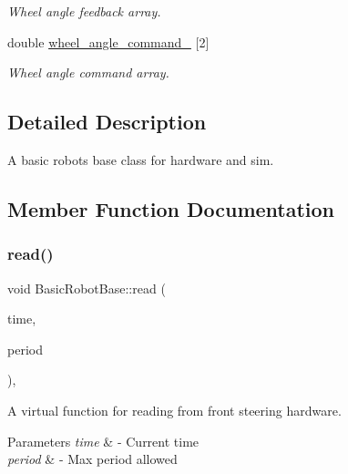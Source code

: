 \begin{DoxyCompactItemize}
\begin{DoxyCompactList}\small\item\em Wheel angle feedback array. \end{DoxyCompactList}\item 
\mbox{\label{classBasicRobotBase_ae960e122456704d3319c404bb1d88c6b}} 
double \hyperlink{classBasicRobotBase_ae960e122456704d3319c404bb1d88c6b}{wheel\+\_\+angle\+\_\+command\+\_\+} \mbox{[}2\mbox{]}
\begin{DoxyCompactList}\small\item\em Wheel angle command array. \end{DoxyCompactList}\end{DoxyCompactItemize}


\subsection{Detailed Description}
A basic robot\textquotesingle{}s base class for hardware and sim. 

\subsection{Member Function Documentation}
\mbox{\label{classBasicRobotBase_a64bb2c7bed72e98fb62a37d6beb4fe5a}} 
\subsubsection{\texorpdfstring{read()}{read()}}
{\footnotesize\ttfamily void Basic\+Robot\+Base\+::read (\begin{DoxyParamCaption}\item[{const ros\+::\+Time \&}]{time,  }\item[{const ros\+::\+Duration \&}]{period }\end{DoxyParamCaption})\hspace{0.3cm}{\ttfamily [override]}, {\ttfamily [virtual]}}



A virtual function for reading from front steering hardware. 


\begin{DoxyParams}{Parameters}
{\em time} & -\/ Current time \\
\hline
{\em period} & -\/ Max period allowed \\
\hline
\end{DoxyParams}


